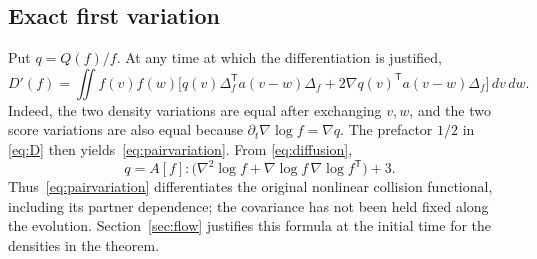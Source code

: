 \documentclass[11pt]{article}
\numberwithin{equation}{section}
\begin{document}
\subsection{Exact first variation}
Put \(q=Q(f)/f\). At any time at which the differentiation is justified,
\begin{equation}\label{eq:pairvariation}
 D'(f)=\iint f(v)f(w)
 \bigl[q(v)\Delta_f^{\mathsf T}a(v-w)\Delta_f
       +2\nabla q(v)^{\mathsf T}a(v-w)\Delta_f\bigr]\,dv\,dw.
\end{equation}
Indeed, the two density variations are equal after exchanging \(v,w\),
and the two score variations are also equal because
\(\partial_t\nabla\log f=\nabla q\). The prefactor \(1/2\) in
\eqref{eq:D} then yields~\eqref{eq:pairvariation}. From
\eqref{eq:diffusion},
\begin{equation}\label{eq:q}
 q=A[f]:\bigl(\nabla^2\log f+
                  \nabla\log f\,\nabla\log f^{\mathsf T}\bigr)+3.
\end{equation}
Thus~\eqref{eq:pairvariation} differentiates the original nonlinear
collision functional, including its partner dependence; the covariance
has not been held fixed along the evolution. Section~\ref{sec:flow}
justifies this formula at the initial time for the densities in the theorem.
\end{document}
